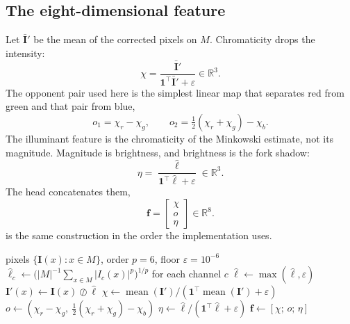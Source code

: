 \subsection{The eight-dimensional feature}
\label{sec:icph-feature}

Let $\bar{\mathbf{I}}'$ be the mean of the corrected pixels on $M$. Chromaticity drops the intensity:
\begin{equation}
\chi
= \frac{\bar{\mathbf{I}}'}{\mathbf{1}^{\top}\bar{\mathbf{I}}'+\varepsilon}
\in\mathbb{R}^{3}.
\label{eq:chroma}
\end{equation}
The opponent pair used here is the simplest linear map that separates red from green and that pair from blue,
\begin{equation}
o_{1}=\chi_{r}-\chi_{g},
\qquad
o_{2}=\tfrac{1}{2}(\chi_{r}+\chi_{g})-\chi_{b}.
\label{eq:opponent}
\end{equation}
The illuminant feature is the chromaticity of the Minkowski estimate, not its magnitude. Magnitude is brightness, and brightness is the fork shadow:
\begin{equation}
\eta
= \frac{\hat{\ell}}{\mathbf{1}^{\top}\hat{\ell}+\varepsilon}
\in\mathbb{R}^{3}.
\label{eq:eta}
\end{equation}
The head concatenates them,
\begin{equation}
\mathbf{f}
= \begin{bmatrix} \chi \\ o \\ \eta \end{bmatrix}
\in\mathbb{R}^{8}.
\label{eq:feature}
\end{equation}
 is the same construction in the order the implementation uses.

\begin{algorithm}[t]
\caption{Chromatic feature of one mask}
\label{alg:feature}
\begin{algorithmic}[1]
\Require pixels $\{\mathbf{I}(x):x\in M\}$, order $p=6$, floor $\varepsilon=10^{-6}$
\State $\hat{\ell}_c \gets \big(\lvert M\rvert^{-1}\sum_{x\in M}\lvert I_c(x)\rvert^{p}\big)^{1/p}$ for each channel $c$
\State $\hat{\ell} \gets \max(\hat{\ell},\varepsilon)$
\State $\mathbf{I}'(x) \gets \mathbf{I}(x)\oslash\hat{\ell}$
\State $\chi \gets \operatorname{mean}(\mathbf{I}') / (\mathbf{1}^{\top}\operatorname{mean}(\mathbf{I}')+\varepsilon)$
\State $o \gets (\chi_r-\chi_g,\ \tfrac{1}{2}(\chi_r+\chi_g)-\chi_b)$
\State $\eta \gets \hat{\ell}/(\mathbf{1}^{\top}\hat{\ell}+\varepsilon)$
\State \Return $\mathbf{f}\gets[\chi;\,o;\,\eta]$
\end{algorithmic}
\end{algorithm}

